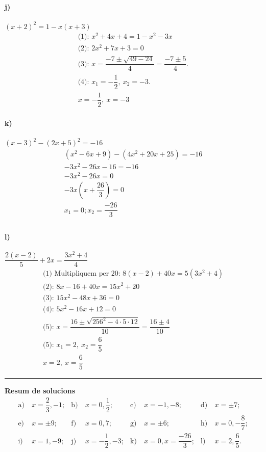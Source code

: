 \documentclass[11pt,a4paper]{article}
\begin{document}
\paragraph{j)} $(x + 2)^2 = 1 - x(x + 3)$
\[
\begin{aligned}
\text{(1): } x^2 + 4x + 4 = 1 - x^2 - 3x \\
\text{(2): } 2x^2 + 7x + 3 = 0 \\
\text{(3): } x=\dfrac{-7\pm\sqrt{49-24}}{4}=\dfrac{-7\pm5}{4}. \\
\text{(4): } x_1=-\dfrac{1}{2},\ x_2=-3. \\
\boxed{x=-\dfrac{1}{2},\ x=-3}
\end{aligned}
\]

\paragraph{k)} $(x - 3)^2 - (2x + 5)^2 = -16$
\[
\begin{aligned}
(x^2 -6x+9)-(4x^2 +20x+25)=-16\\
-3x^2 -26x-16 = - 16\\
-3x^2 -26x = 0 \\
-3x\left(x+\dfrac{26}{3}\right)=0 \\
\boxed{x_1 = 0; x_2 = \dfrac{-26}{3}} \\
\end{aligned}
\]

\paragraph{l)} $\dfrac{2(x - 2)}{5} + 2x = \dfrac{3x^2 + 4}{4}$
\[
\begin{aligned}
\text{(1) Multipliquem per 20: } 8(x-2)+40x=5(3x^2+4) \\
\text{(2): } 8x-16+40x=15x^2+20 \\
\text{(3): } 15x^2 - 48x + 36 = 0 \\
\text{(4): } 5x^2 - 16x +  12 = 0 \\
\text{(5): } x=\dfrac{16\pm\sqrt{256^2 - 4\cdot 5 \cdot 12}}{10}=\dfrac{16  \pm 4}{10} \\
\text{(5): }x_1=2,\ x_2=\dfrac{6}{5} \\
\boxed{x=2,\ x=\dfrac{6}{5}}
\end{aligned}
\]

\bigskip\hrule\bigskip

\textbf{Resum de solucions}
\[
\begin{aligned}
\text{a)}&\ x=\dfrac{2}{3},-1; &
\text{b)}&\ x=0,\dfrac{1}{2}; &
\text{c)}&\ x=-1,-8; &
\text{d)}&\ x=\pm7; \\
\text{e)}&\ x=\pm9; &
\text{f)}&\ x=0,7; &
\text{g)}&\ x=\pm6; &
\text{h)}&\ x=0,-\dfrac{8}{7}; \\
\text{i)}&\ x=1,-9; &
\text{j)}&\ x=-\dfrac{1}{2},-3; &
\text{k)}&\ x = 0, x = \dfrac{-26}{3}; &
\text{l)}&\ x=2,\dfrac{6}{5}.
\end{aligned}
\]
\end{document}
